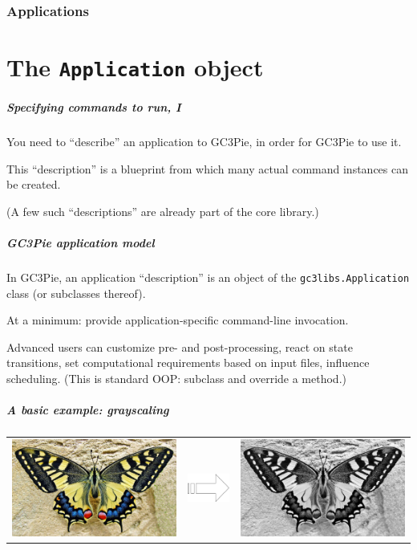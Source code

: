 \documentclass[english,serif,mathserif,xcolor=pdftex,dvipsnames,table]{beamer}
\begin{document}
\section{Applications}
\part{The \texttt{Application} object}

\begin{frame}
  \frametitle{Specifying commands to run, I}

  You need to ``describe'' an application to GC3Pie, in order for
  GC3Pie to use it.

  \+
  This ``description'' is a blueprint from which many actual
  command instances can be created.

  \+
  (A few such ``descriptions'' are already part of the core library.)
\end{frame}


\begin{frame}
  \frametitle{GC3Pie application model}

  In GC3Pie, an application ``description'' is an object of the
  \texttt{gc3libs.Application} class (or subclasses thereof).

  \+
  At a minimum: provide application-specific command-line invocation.

  \+
  Advanced users can customize pre- and post-processing, react on
  state transitions, set computational requirements based on input
  files, influence scheduling.  (This is standard OOP: subclass and
  override a method.)
\end{frame}


\begin{frame}[fragile]
\frametitle{A basic example: grayscaling}
\begin{tabular}{ccc}
  {\includegraphics[width=0.4\linewidth]{fig/butterfly.jpg}}
  &
  {\includegraphics[width=0.1\linewidth,totalheight=0.25\textheight]{fig/arrow.pdf}}
  &
  {\includegraphics[width=0.4\linewidth]{fig/gray-butterfly.jpg}}
\end{tabular}

\end{frame}
\end{document}
